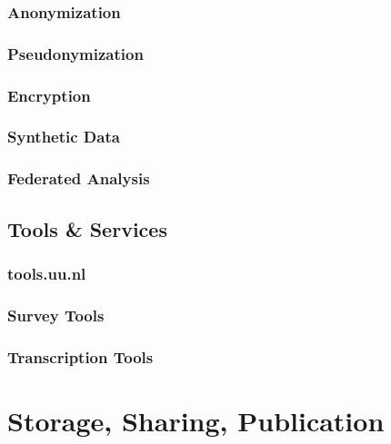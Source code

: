 \documentclass[
]{book}
\begin{document}
\hypertarget{anonymization}{%
\section{Anonymization}\label{anonymization}}

\hypertarget{pseudonymization}{%
\section{Pseudonymization}\label{pseudonymization}}

\hypertarget{encryption}{%
\section{Encryption}\label{encryption}}

\hypertarget{synthetic-data}{%
\section{Synthetic Data}\label{synthetic-data}}

\hypertarget{federated-analysis}{%
\section{Federated Analysis}\label{federated-analysis}}

\hypertarget{tools-and-services}{%
\chapter{Tools \& Services}\label{tools-and-services}}

\hypertarget{tools.uu.nl}{%
\section{tools.uu.nl}\label{tools.uu.nl}}

\hypertarget{survey-tools}{%
\section{Survey Tools}\label{survey-tools}}

\hypertarget{transcription-tools}{%
\section{Transcription Tools}\label{transcription-tools}}

\hypertarget{part-storage-sharing-publication}{%
\part{Storage, Sharing, Publication}\label{part-storage-sharing-publication}}
\end{document}
